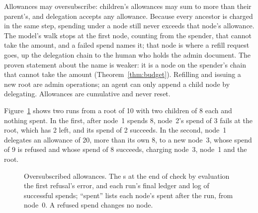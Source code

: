 Allowances may oversubscribe: children's allowances may sum to more than their
parent's, and delegation accepts any allowance. Because every ancestor is
charged in the same step, spending under a node still never exceeds that
node's allowance. The model's walk stops at the first node, counting from the
spender, that cannot take the amount, and a failed spend names it; that node
is where a refill request goes, up the delegation chain to the human who holds
the admin document. The proven statement about the name is weaker: it is a
node on the spender's chain that cannot take the amount (Theorem~\ref{thm:budget}).
Refilling and issuing a new root are admin operations; an agent can only
append a child node by delegating. Allowances are cumulative and never reset.

Figure~\ref{fig:budget} shows two runs from a root of 10 with two children of
8 each and nothing spent. In the first, after node~1 spends 8, node~2's spend
of 3 fails at the root, which has 2 left, and its spend of 2 succeeds. In the
second, node~1 delegates an allowance of 20, more than its own 8, to a new
node~3, whose spend of 9 is refused and whose spend of 8 succeeds, charging
node~3, node~1 and the root.

\begin{figure}[t]
\centering

\caption{Oversubscribed allowances. The s at the end of
 check by evaluation the first refusal's error, and each
run's final ledger and log of successful spends; ``spent'' lists each node's
spent after the run, from node~0. A refused spend changes no
node.}\label{fig:budget}
\end{figure}
